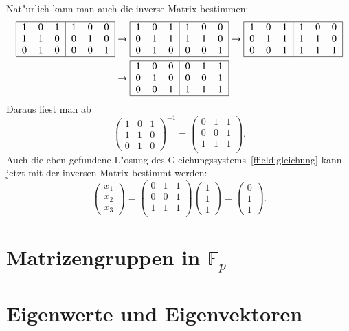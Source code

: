 Nat"urlich kann man auch die inverse Matrix bestimmen:
\begin{align*}
\begin{tabular}{|>{$}c<{$}>{$}c<{$}>{$}c<{$}|>{$}c<{$}>{$}c<{$}>{$}c<{$}|}
\hline
1&0&1&1&0&0\\
1&1&0&0&1&0\\
0&1&0&0&0&1\\
\hline
\end{tabular}
&
\rightarrow
\begin{tabular}{|>{$}c<{$}>{$}c<{$}>{$}c<{$}|>{$}c<{$}>{$}c<{$}>{$}c<{$}|}
\hline
1&0&1&1&0&0\\
0&1&1&1&1&0\\
0&1&0&0&0&1\\
\hline
\end{tabular}
\rightarrow
\begin{tabular}{|>{$}c<{$}>{$}c<{$}>{$}c<{$}|>{$}c<{$}>{$}c<{$}>{$}c<{$}|}
\hline
1&0&1&1&0&0\\
0&1&1&1&1&0\\
0&0&1&1&1&1\\
\hline
\end{tabular}
\\
&
\rightarrow
\begin{tabular}{|>{$}c<{$}>{$}c<{$}>{$}c<{$}|>{$}c<{$}>{$}c<{$}>{$}c<{$}|}
\hline
1&0&0&0&1&1\\
0&1&0&0&0&1\\
0&0&1&1&1&1\\
\hline
\end{tabular}
\end{align*}
Daraus liest man ab
\[
\begin{pmatrix}
1&0&1\\
1&1&0\\
0&1&0
\end{pmatrix}^{-1}
=
\begin{pmatrix}
0&1&1\\
0&0&1\\
1&1&1\\
\end{pmatrix}.
\]
Auch die eben gefundene L"osung des Gleichungssystems~\eqref{ffield:gleichung}
kann jetzt mit der inversen Matrix bestimmt werden:
\[
\begin{pmatrix}x_1\\x_2\\x_3\end{pmatrix}
=
\begin{pmatrix}
0&1&1\\
0&0&1\\
1&1&1\\
\end{pmatrix}
\begin{pmatrix}1\\1\\1\end{pmatrix}
=
\begin{pmatrix}0\\1\\1\end{pmatrix}.
\]

\section{Matrizengruppen in $\mathbb F_p$}

\section{Eigenwerte und Eigenvektoren}

